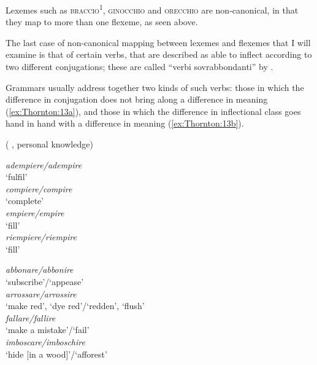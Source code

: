 \documentclass[output=paper]{langsci/langscibook}
\begin{document}
  
Lexemes such as \textsc{braccio\textsuperscript{1}, ginocchio} and
\textsc{orecchio} are non-canonical, in that they map to more than one
flexeme, as seen above.

The last case of non-canonical mapping between lexemes and flexemes that
I will examine is that of certain  verbs, that are described as
able to inflect according to two different conjugations; these are
called ``verbi sovrabbondanti'' by %
\citet{Serianni1988}%
%
.


Grammars usually address together two kinds of such verbs: those in
which the difference in conjugation does not bring along a difference in
meaning (\ref{ex:Thornton:13a}), and those in which the difference in inflectional class
goes hand in hand with a difference in meaning (\ref{ex:Thornton:13b}).

\ea\label{ex:Thornton:13}  %
(%
\citealt{Serianni1988}%
%
, personal knowledge)
%


\ea\label{ex:Thornton:13a}

\ea \emph{adempiere\slash{}adempire} \\
\glt `fulfil'\\

\ex \emph{compiere\slash{}compire} \\
\glt `complete'\\

\ex \emph{empiere\slash{}empire} \\
\glt `fill'\\

\ex \emph{riempiere\slash{}riempire }\\
\glt `fill'\\
\z
\ex\label{ex:Thornton:13b}

\ea \emph{abbonare\slash{}abbonire} \\
\glt `subscribe'\slash{}`appease'\\

\ex \emph{arrossare\slash{}arrossire} \\
\glt `make red', `dye red'\slash{}`redden', `flush'\\

\ex \emph{fallare\slash{}fallire} \\
\glt `make a mistake'\slash{}`fail'\\

\ex \emph{imboscare\slash{}imboschire} \\
\glt `hide {[}in a wood{]}'\slash{}`afforest'\\
\end{document}
